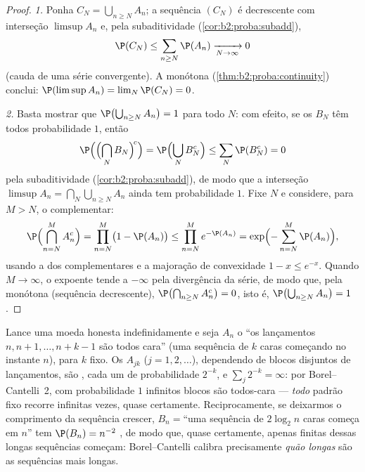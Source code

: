 \begin{proof}
\emph{1.} Ponha $C_N = \bigcup_{n \geq N}A_n$; a sequência $(C_N)$
é decrescente com interseção $\limsup A_n$ e, pela subaditividade
 (\cref{cor:b2:proba:subadd}),
\[
\P(C_N) \leq \sum_{n \geq N}\P(A_n)
\xrightarrow[N\to\infty]{} 0
\]
(cauda de uma série convergente). A  monótona
(\cref{thm:b2:proba:continuity}) conclui: $\P(\limsup A_n) =
\lim_N \P(C_N) = 0$.

\emph{2.} Basta mostrar que $\P\bigl(\bigcup_{n\geq N}A_n\bigr)
= 1$ para todo $N$: com efeito, se os  $B_N$ têm todos
probabilidade $1$, então
\[
\P\Bigl(\Bigl(\bigcap_NB_N\Bigr)^{\!c}\Bigr)
= \P\Bigl(\bigcup_NB_N^c\Bigr)
\leq \sum_N\P(B_N^c) = 0
\]
pela subaditividade 
(\cref{cor:b2:proba:subadd}), de modo que a interseção 
$\limsup A_n = \bigcap_N\bigcup_{n\geq N}A_n$ ainda tem
probabilidade $1$. Fixe $N$ e considere, para $M > N$, o
complementar:
\[
\P\Bigl(\bigcap_{n=N}^{M} A_n^c\Bigr)
= \prod_{n=N}^{M}\bigl(1 - \P(A_n)\bigr)
\leq \prod_{n=N}^{M} e^{-\P(A_n)}
= \exp\Bigl(-\sum_{n=N}^M \P(A_n)\Bigr) ,
\]
usando a  dos complementares e a majoração de convexidade $1 -
x \leq e^{-x}$. Quando $M \to \infty$, o expoente tende a $-\infty$
pela divergência da série, de modo que, pela  monótona
(sequência decrescente), $\P\bigl(\bigcap_{n \geq N}A_n^c\bigr) = 0$,
isto é, $\P\bigl(\bigcup_{n \geq N}A_n\bigr) = 1$.
\end{proof}

\begin{example}\label{ex:b2:proba:runs}
Lance uma moeda honesta indefinidamente e seja $A_n$ o  ``os lançamentos $n,
n+1, \dots, n + k - 1$ são todos cara'' (uma sequência de $k$ caras
começando no instante $n$), para $k$ fixo. Os  $A_{jk}$ ($j =
1, 2, \dots$), dependendo de blocos disjuntos de lançamentos, são
, cada um de probabilidade $2^{-k}$, e $\sum_j 2^{-k} =
\infty$: por Borel--Cantelli~2, com probabilidade $1$ infinitos
blocos são todos-cara --- \emph{todo} padrão fixo recorre
infinitas vezes, quase certamente. Reciprocamente, se deixarmos o comprimento
da sequência crescer, $B_n = {}$``uma sequência de $2\log_2 n$ caras começa em
$n$'' tem $\P(B_n) = n^{-2}$ , de modo que, quase certamente, apenas
finitas dessas longas sequências começam: Borel--Cantelli calibra
precisamente \emph{quão longas} são as sequências mais longas.
\end{example}

